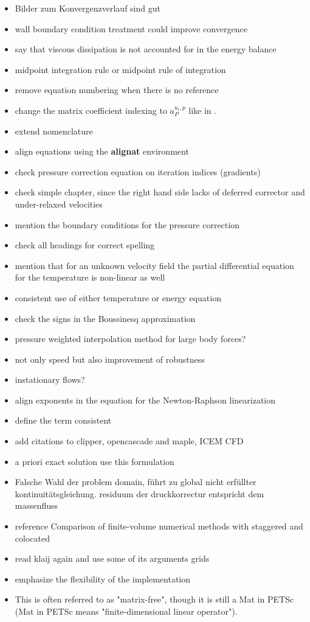 \documentclass[article,type=msc,colorback,accentcolor=tud2a]{tudthesis}
\begin{document}
  \begin{itemize}
    \item Bilder zum Konvergenzverlauf sind gut
    \item wall boundary condition treatment could improve convergence
    \item say that viscous dissipation is not accounted for in the energy balance
    \item midpoint integration rule or midpoint rule of integration
    \item remove equation numbering when there is no reference
    \item change the matrix coefficient indexing to \(a_P^{u_i,p}\) like in \cite{darwish09}.
    \item extend nomenclature
    \item align equations using the \textbf{alignat} environment
    \item check pressure correction equation on iteration indices (gradients)
    \item check simple chapter, since the right hand side lacks of deferred corrector and under-relaxed velocities
    \item mention the boundary conditions for the pressure correction
    \item check all headings for correct spelling
    \item mention that for an unknown velocity field the partial differential equation for the temperature is non-linear as well
    \item consistent use of either temperature or energy equation
    \item check the signs in the Boussinesq approximation
    \item pressure weighted interpolation method for large body forces?
    \item not only speed but also improvement of robustness
    \item instationary flows?
    \item align exponents in the equation for the Newton-Raphson linearization
    \item define the term consistent
    \item add citations to clipper, opencascade and maple, ICEM CFD
    \item a priori exact solution use this formulation
    \item Falsche Wahl der problem domain, führt zu global nicht erfüllter kontinuitätsgleichung. residuum der druckkorrectur entspricht dem massenfluss
    \item reference Comparison of finite-volume numerical methods with staggered and colocated
    \item read klaij again and use some of its arguments
      grids
    \item emphasize the flexibility of the implementation
    \item This is often referred to as "matrix-free", though it is still a Mat in PETSc (Mat in PETSc means "finite-dimensional linear operator").  
  \end{itemize}
\end{document}
